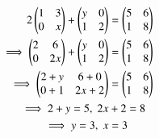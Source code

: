 \begin{align}
    2\myvec{1&3\\0&x} + \myvec{y&0\\1&2} &= \myvec{5&6\\1&8}\\
    \implies \myvec{2&6\\0&2x} + \myvec{y&0\\1&2} &= \myvec{5&6\\1&8}\\
    \implies \myvec{2+y&6+0\\0+1&2x+2} &= \myvec{5&6\\1&8}\\
    \implies 2+y=5,\; 2x&+2=8\\
    \implies y=3,\; x&=3
\end{align}